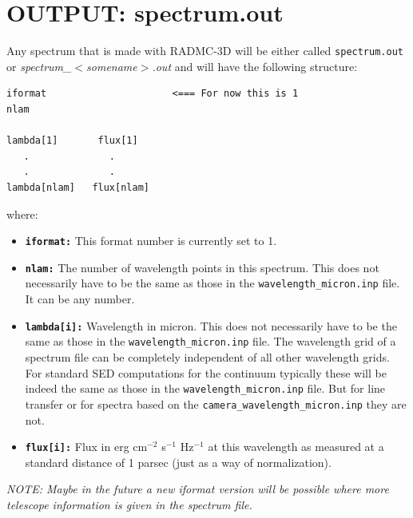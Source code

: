 \documentclass{report}
\newenvironment{asciibox}%
  {\begin{list}{}{%
    \setlength{\topsep}{0.5em}%
    \setlength{\parskip}{0em}%
    \setlength{\parsep}{0em}%
    \setlength{\itemsep}{0em}%
    \setlength{\rightmargin}{0em}%
    \setlength{\leftmargin}{3.0em}%
    \setlength{\labelsep}{1em}%
    \setlength{\labelwidth}{2em}%
  }\normalfont\footnotesize\item}
  {\end{list}}
\begin{document}
\section{OUTPUT: spectrum.out}
\label{sec-output-spectrum-out}
%
Any spectrum that is made with RADMC-3D will be either called
{\small\tt spectrum.out} or {\em spectrum\_$<$somename$>$.out} and will have
the following structure:
\begin{asciibox}\begin{verbatim}
iformat                      <=== For now this is 1
nlam

lambda[1]       flux[1]
   .              .
   .              .
lambda[nlam]   flux[nlam]
\end{verbatim}\end{asciibox}
where:
\begin{itemize}
\item[] {\small\tt\bf iformat:} This format number is currently set to 1.
\item[] {\small\tt\bf nlam:} The number of wavelength points in this spectrum.
  This does not necessarily have to be the same as those in the
  {\small\tt wavelength\_micron.inp} file. It can be any number.
\item[] {\small\tt\bf lambda[i]:} Wavelength in micron.  This does not necessarily
  have to be the same as those in the {\small\tt wavelength\_micron.inp} file.
  The wavelength grid of a spectrum file can be completely independent 
  of all other wavelength grids. For standard SED computations for the
  continuum typically these will be indeed the same as those in the
  {\small\tt wavelength\_micron.inp} file. But for line transfer or for 
  spectra based on the {\small\tt camera\_wavelength\_micron.inp} they are
  not. 
\item[] {\small\tt\bf flux[i]:} Flux in erg cm$^{-2}$ s$^{-1}$ Hz$^{-1}$ at this
  wavelength as measured at a standard distance of 1 parsec (just as a way
  of normalization).
\end{itemize}

{\em NOTE: Maybe in the future a new iformat version will be possible
where more telescope information is given in the spectrum file.}
\end{document}
